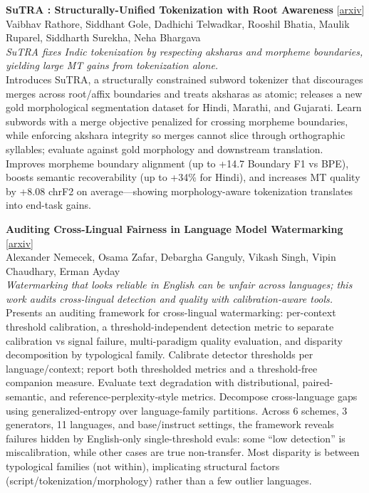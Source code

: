 \documentclass[12pt,letterpaper]{article}
\begin{document}
\medskip

{\small\textbf{SuTRA : Structurally-Unified Tokenization with Root Awareness}} {\scriptsize[\href{https://arxiv.org/abs/2608.18087}{arxiv}]}\\
{\scriptsize Vaibhav Rathore, Siddhant Gole, Dadhichi Telwadkar, Rooshil Bhatia, Maulik Ruparel, Siddharth Surekha, Neha Bhargava}\\

{\small\textit{SuTRA fixes Indic tokenization by respecting aksharas and morpheme boundaries, yielding large MT gains from tokenization alone.}}\\[1pt]
{\footnotesize Introduces SuTRA, a structurally constrained subword tokenizer that discourages merges across root/affix boundaries and treats aksharas as atomic; releases a new gold morphological segmentation dataset for Hindi, Marathi, and Gujarati. Learn subwords with a merge objective penalized for crossing morpheme boundaries, while enforcing akshara integrity so merges cannot slice through orthographic syllables; evaluate against gold morphology and downstream translation. Improves morpheme boundary alignment (up to +14.7 Boundary F1 vs BPE), boosts semantic recoverability (up to +34\% for Hindi), and increases MT quality by +8.08 chrF2 on average---showing morphology-aware tokenization translates into end-task gains.}

\medskip

{\small\textbf{Auditing Cross-Lingual Fairness in Language Model Watermarking}} {\scriptsize[\href{https://arxiv.org/abs/2608.20047}{arxiv}]}\\
{\scriptsize Alexander Nemecek, Osama Zafar, Debargha Ganguly, Vikash Singh, Vipin Chaudhary, Erman Ayday}\\

{\small\textit{Watermarking that looks reliable in English can be unfair across languages; this work audits cross-lingual detection and quality with calibration-aware tools.}}\\[1pt]
{\footnotesize Presents an auditing framework for cross-lingual watermarking: per-context threshold calibration, a threshold-independent detection metric to separate calibration vs signal failure, multi-paradigm quality evaluation, and disparity decomposition by typological family. Calibrate detector thresholds per language/context; report both thresholded metrics and a threshold-free companion measure. Evaluate text degradation with distributional, paired-semantic, and reference-perplexity-style metrics. Decompose cross-language gaps using generalized-entropy over language-family partitions. Across 6 schemes, 3 generators, 11 languages, and base/instruct settings, the framework reveals failures hidden by English-only single-threshold evals: some ``low detection'' is miscalibration, while other cases are true non-transfer. Most disparity is between typological families (not within), implicating structural factors (script/tokenization/morphology) rather than a few outlier languages.}
\end{document}
